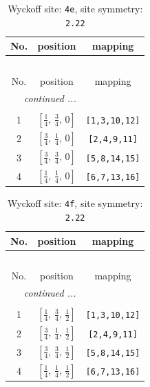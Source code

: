\documentclass[fleqn,8pt]{jsarticle}
\begin{document}
\begin{longtable}{ccc}
\caption{Wyckoff site: {\tt 4e}, site symmetry: {\tt 2.22}}
 \\
 \hline \hline
No. & position & mapping \\ \hline \endfirsthead

\multicolumn{2}{l}{\tablename\ \thetable{}} \\
 \hline \hline
No. & position & mapping \\ \hline \endhead

 \hline \hline
\multicolumn{2}{r}{\footnotesize\it continued ...} \\ \endfoot

 \hline \hline
\multicolumn{2}{r}{} \\ \endlastfoot

1 & $\left[ \frac{1}{4},\, \frac{3}{4},\, 0 \right]$ & {\tt [1,3,10,12]} \\ \hline
2 & $\left[ \frac{3}{4},\, \frac{1}{4},\, 0 \right]$ & {\tt [2,4,9,11]} \\ \hline
3 & $\left[ \frac{3}{4},\, \frac{3}{4},\, 0 \right]$ & {\tt [5,8,14,15]} \\ \hline
4 & $\left[ \frac{1}{4},\, \frac{1}{4},\, 0 \right]$ & {\tt [6,7,13,16]} \\
\end{longtable}
\renewcommand{\arraystretch}{1.2}
\begin{longtable}{ccc}
\caption{Wyckoff site: {\tt 4f}, site symmetry: {\tt 2.22}}
 \\
 \hline \hline
No. & position & mapping \\ \hline \endfirsthead

\multicolumn{2}{l}{\tablename\ \thetable{}} \\
 \hline \hline
No. & position & mapping \\ \hline \endhead

 \hline \hline
\multicolumn{2}{r}{\footnotesize\it continued ...} \\ \endfoot

 \hline \hline
\multicolumn{2}{r}{} \\ \endlastfoot

1 & $\left[ \frac{1}{4},\, \frac{3}{4},\, \frac{1}{2} \right]$ & {\tt [1,3,10,12]} \\ \hline
2 & $\left[ \frac{3}{4},\, \frac{1}{4},\, \frac{1}{2} \right]$ & {\tt [2,4,9,11]} \\ \hline
3 & $\left[ \frac{3}{4},\, \frac{3}{4},\, \frac{1}{2} \right]$ & {\tt [5,8,14,15]} \\ \hline
4 & $\left[ \frac{1}{4},\, \frac{1}{4},\, \frac{1}{2} \right]$ & {\tt [6,7,13,16]} \\
\end{longtable}
\end{document}
